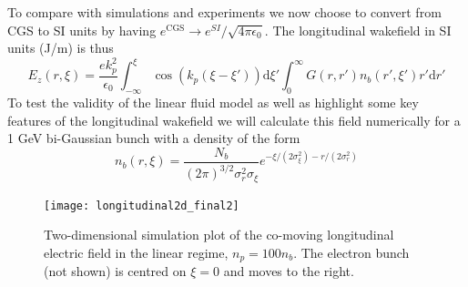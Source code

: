 To compare with simulations and experiments we now choose to convert from CGS to SI units by having $e^{\text{CGS}}\to e^{SI}/\sqrt{4\pi\epsilon_0}$. The longitudinal wakefield in SI units (J/m) is thus
\begin{equation}
E_z(r,\xi)=\frac{e k_p^2}{\epsilon_0} \int_{-\infty}^{\xi} \cos(k_p(\xi-\xi'))\mathrm{d}\xi' \int_{0}^{\infty}G\left(r,r'\right) n_b(r',\xi')r'\mathrm{d}r'
\label{longitudinalforce}
\end{equation}
To test the validity of the linear fluid model as well as highlight some key features of the longitudinal wakefield we will calculate this field numerically for a 1 GeV bi-Gaussian bunch with a density of the form
\begin{equation}
n_b(r,\xi)=\frac{N_b}{(2\pi)^{3/2}\sigma_r^2\sigma_{\xi}}e^{-\xi/(2\sigma_{\xi}^2)-r/(2\sigma_{r}^2)}
\label{bigaussian}
\end{equation}
\begin{figure}
\centering
\texttt{[image: longitudinal2d\_final2]}
\caption{\small{Two-dimensional simulation plot of the co-moving longitudinal electric field in the linear regime, $n_p=100n_b$. The electron bunch (not shown) is centred on $\xi=0$ and moves to the right.}}
\label{longitudinal_plot}
\end{figure}
\clearpage
